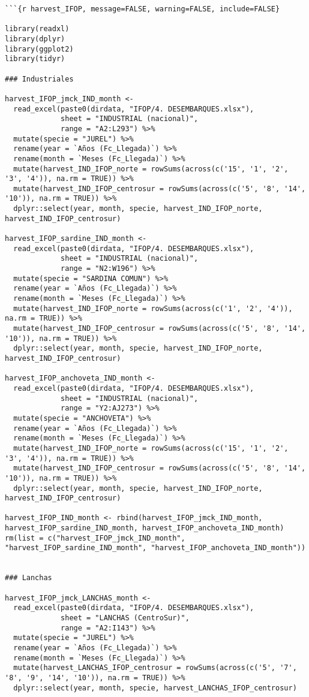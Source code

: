 \begin{verbatim}
```{r harvest_IFOP, message=FALSE, warning=FALSE, include=FALSE}

library(readxl)
library(dplyr)
library(ggplot2)
library(tidyr)

### Industriales 

harvest_IFOP_jmck_IND_month <- 
  read_excel(paste0(dirdata, "IFOP/4. DESEMBARQUES.xlsx"), 
             sheet = "INDUSTRIAL (nacional)", 
             range = "A2:L293") %>% 
  mutate(specie = "JUREL") %>%
  rename(year = `Años (Fc_Llegada)`) %>%
  rename(month = `Meses (Fc_Llegada)`) %>%
  mutate(harvest_IND_IFOP_norte = rowSums(across(c('15', '1', '2', '3', '4')), na.rm = TRUE)) %>%
  mutate(harvest_IND_IFOP_centrosur = rowSums(across(c('5', '8', '14', '10')), na.rm = TRUE)) %>% 
  dplyr::select(year, month, specie, harvest_IND_IFOP_norte, harvest_IND_IFOP_centrosur)

harvest_IFOP_sardine_IND_month <- 
  read_excel(paste0(dirdata, "IFOP/4. DESEMBARQUES.xlsx"), 
             sheet = "INDUSTRIAL (nacional)", 
             range = "N2:W196") %>% 
  mutate(specie = "SARDINA COMUN") %>%
  rename(year = `Años (Fc_Llegada)`) %>%
  rename(month = `Meses (Fc_Llegada)`) %>%
  mutate(harvest_IND_IFOP_norte = rowSums(across(c('1', '2', '4')), na.rm = TRUE)) %>%
  mutate(harvest_IND_IFOP_centrosur = rowSums(across(c('5', '8', '14', '10')), na.rm = TRUE)) %>% 
  dplyr::select(year, month, specie, harvest_IND_IFOP_norte, harvest_IND_IFOP_centrosur)

harvest_IFOP_anchoveta_IND_month <- 
  read_excel(paste0(dirdata, "IFOP/4. DESEMBARQUES.xlsx"), 
             sheet = "INDUSTRIAL (nacional)", 
             range = "Y2:AJ273") %>% 
  mutate(specie = "ANCHOVETA") %>%
  rename(year = `Años (Fc_Llegada)`) %>%
  rename(month = `Meses (Fc_Llegada)`) %>%
  mutate(harvest_IND_IFOP_norte = rowSums(across(c('15', '1', '2', '3', '4')), na.rm = TRUE)) %>%
  mutate(harvest_IND_IFOP_centrosur = rowSums(across(c('5', '8', '14', '10')), na.rm = TRUE)) %>% 
  dplyr::select(year, month, specie, harvest_IND_IFOP_norte, harvest_IND_IFOP_centrosur)

harvest_IFOP_IND_month <- rbind(harvest_IFOP_jmck_IND_month, harvest_IFOP_sardine_IND_month, harvest_IFOP_anchoveta_IND_month)
rm(list = c("harvest_IFOP_jmck_IND_month", "harvest_IFOP_sardine_IND_month", "harvest_IFOP_anchoveta_IND_month"))


### Lanchas

harvest_IFOP_jmck_LANCHAS_month <- 
  read_excel(paste0(dirdata, "IFOP/4. DESEMBARQUES.xlsx"), 
             sheet = "LANCHAS (CentroSur)", 
             range = "A2:I143") %>% 
  mutate(specie = "JUREL") %>%
  rename(year = `Años (Fc_Llegada)`) %>%
  rename(month = `Meses (Fc_Llegada)`) %>%
  mutate(harvest_LANCHAS_IFOP_centrosur = rowSums(across(c('5', '7', '8', '9', '14', '10')), na.rm = TRUE)) %>% 
  dplyr::select(year, month, specie, harvest_LANCHAS_IFOP_centrosur)


\end{verbatim}
